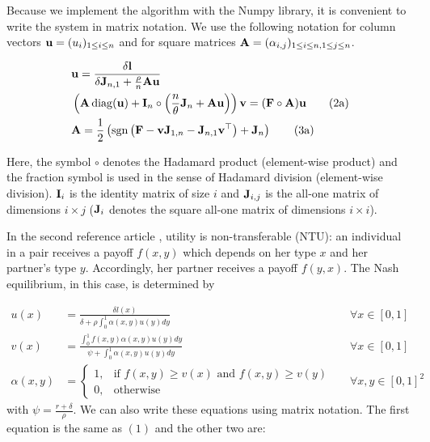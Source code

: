 Because we implement the algorithm with the Numpy library, it is convenient to write the system in matrix notation. We use the following notation for column vectors $\boldsymbol{\mathbf{u}} = (u_i)_{1 \leq i \leq n}$ and for square matrices $\boldsymbol{\mathbf{A}} = (\alpha_{i,j})_{1 \leq i \leq n, 1 \leq j \leq n}$.





\begin{align}[left=\empheqlbrace]
	&\vect{u} = \frac{\delta \vect{l}}{\delta \vect{J}_{n,1} + \frac{\rho}{n} \vect{A}\vect{u}}\\
	&\left(\vect{A} \diag(\vect{u}) + \vect{I}_n \circ \left(\frac{n}{\theta} \vect{J}_n + \vect{A} \vect{u}\right)\right) \vect{v} = (\vect{F} \circ \vect{A}) \vect{u}
	\tag{2a}\\
	&\vect{A} = \frac{1}{2} \left( \sgn{\left( \vect{F} - \vect{v} \vect{J}_{1,n} - \vect{J}_{n,1} \vect{v}^\top \right)} + \vect{J}_n \right)
	\tag{3a}
\end{align}
 
Here, the symbol $\circ$ denotes the Hadamard product (element-wise product) and the fraction symbol is used in the sense of Hadamard division (element-wise division).
$\boldsymbol{\mathbf{I}}_i$ is the identity matrix of size $i$ and $\boldsymbol{\mathbf{J}}_{i,j}$ is the all-one matrix of dimensions $i \times j$ ($\boldsymbol{\mathbf{J}}_{i}$ denotes the square all-one matrix of dimensions $i \times i$).


In the second reference article \citep{smith_marriage_2006}, utility is non-transferable (NTU): an individual in a pair receives a payoff $f(x,y)$ which depends on her type $x$ and her partner's type $y$. Accordingly, her partner receives a payoff $f(y,x)$. The Nash equilibrium, in this case, is determined by

\begin{align*}[left=\empheqlbrace]
	u(x) &= \frac{\delta l(x)}{\delta + \rho \int_{0}^{1} \alpha(x,y) u(y) dy} &&\forall x \in [0,1]\\
	v(x) &= \frac{\int_{0}^{1} f(x,y) \alpha(x,y) u(y) dy}{\psi + \int_{0}^{1} \alpha(x,y) u(y) dy} &&\forall x \in [0,1]\\
	\alpha(x,y) &=
	\begin{cases}
		1, & \text{if } f(x,y) \geq v(x) \text{ and } f(x,y) \geq v(y)\\
		0, & \text{otherwise}
	\end{cases}
	&&\forall x,y \in [0,1]^2 
\end{align*}
with $\psi = \frac{r+\delta}{\rho}$. We can also write these equations using matrix notation. The first equation is the same as $(1)$ and the other two are:

